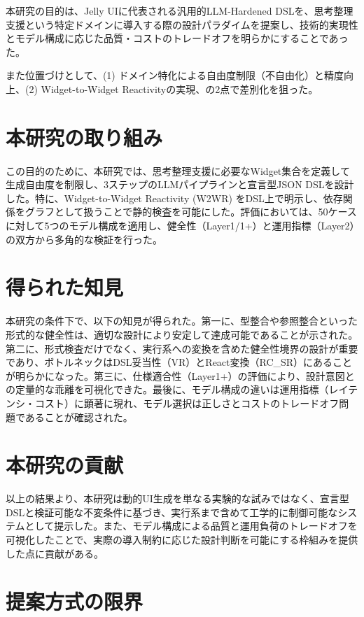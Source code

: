 \documentclass[senior,final,11pt,dvipdfmx]{iputit-thesis}
\begin{document}
本研究の目的は、Jelly UIに代表される汎用的LLM-Hardened DSLを、思考整理支援という特定ドメインに導入する際の設計パラダイムを提案し、技術的実現性とモデル構成に応じた品質・コストのトレードオフを明らかにすることであった。

また位置づけとして、(1) ドメイン特化による自由度制限（不自由化）と精度向上、(2) Widget-to-Widget Reactivityの実現、の2点で差別化を狙った。

\section{本研究の取り組み}
\label{sec:conc_work}

この目的のために、本研究では、思考整理支援に必要なWidget集合を定義して生成自由度を制限し、3ステップのLLMパイプラインと宣言型JSON DSLを設計した。特に、Widget-to-Widget Reactivity (W2WR) をDSL上で明示し、依存関係をグラフとして扱うことで静的検査を可能にした。評価においては、50ケースに対して5つのモデル構成を適用し、健全性（Layer1/1+）と運用指標（Layer2）の双方から多角的な検証を行った。

\section{得られた知見}
\label{sec:conc_findings}

本研究の条件下で、以下の知見が得られた。第一に、型整合や参照整合といった形式的な健全性は、適切な設計により安定して達成可能であることが示された。第二に、形式検査だけでなく、実行系への変換を含めた健全性境界の設計が重要であり、ボトルネックはDSL妥当性（VR）とReact変換（RC\_SR）にあることが明らかになった。第三に、仕様適合性（Layer1+）の評価により、設計意図との定量的な乖離を可視化できた。最後に、モデル構成の違いは運用指標（レイテンシ・コスト）に顕著に現れ、モデル選択は正しさとコストのトレードオフ問題であることが確認された。

\section{本研究の貢献}
\label{sec:conc_contribution}

以上の結果より、本研究は動的UI生成を単なる実験的な試みではなく、宣言型DSLと検証可能な不変条件に基づき、実行系まで含めて工学的に制御可能なシステムとして提示した。また、モデル構成による品質と運用負荷のトレードオフを可視化したことで、実際の導入制約に応じた設計判断を可能にする枠組みを提供した点に貢献がある。



\section{提案方式の限界}
\label{sec:conc_limitations}
\end{document}
